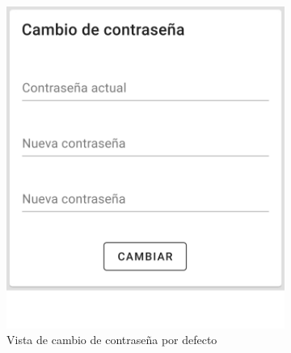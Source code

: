 \begin{figure}[H]
    \centering
    \begin{subfigure}[b]{0.45\textwidth}
        \centering
        \includegraphics[width=\textwidth]{images/app/change-psw-def.png}
        \caption{Vista de cambio de contraseña por defecto \newline}
        \label{fig:app-change-psw_default}
    \end{subfigure}
    \hfill
    \begin{subfigure}[b]{0.45\textwidth}
        \centering

\end{subfigure}
\end{figure}
